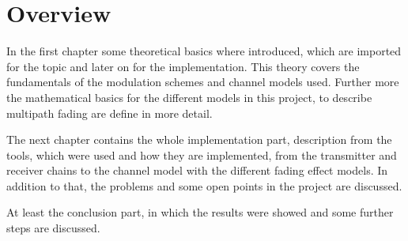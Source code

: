 \section{Overview}

In the first chapter some theoretical basics where introduced, which are imported for the topic and later on for the implementation. This theory covers the fundamentals of the modulation schemes and channel models used. Further more the mathematical basics for the different models in this project, to describe multipath fading are define in more detail.  

The next chapter contains the whole implementation part, description from the tools, which were used and how they are implemented, from the 
transmitter and receiver chains to the channel model with the different fading effect models. In addition to that, the problems and some open points in the project are discussed. 

At least the conclusion part, in which the results were showed and some further steps are discussed. 
